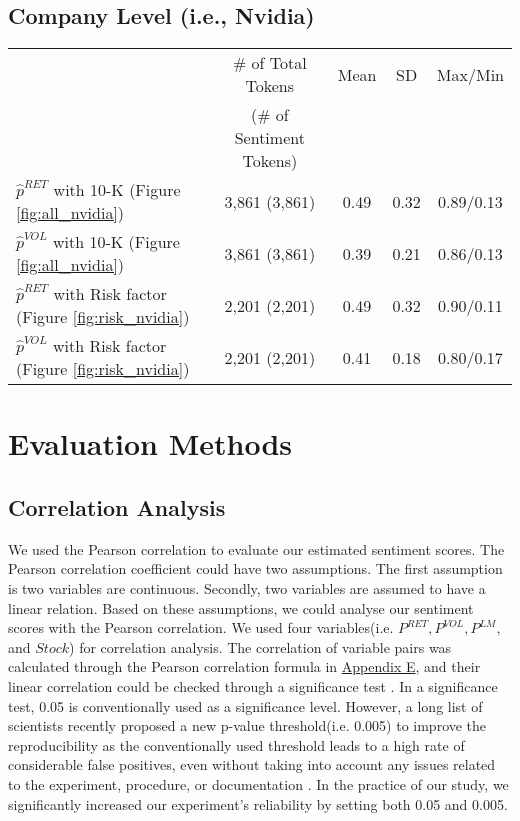 \documentclass[logo,bsc,singlespacing,parskip]{infthesis}
\begin{document}
\subsection*{Company Level (i.e., Nvidia)}
\begin{tabular}{lcccc}
\toprule
 & \# of Total Tokens & Mean & SD & Max/Min \\
 & (\# of Sentiment Tokens) &  &  &  \\
\midrule
$\hat{p}^{RET}$ with 10-K (Figure \ref{fig:all_nvidia})& 3,861 (3,861) & 0.49 & 0.32 & 0.89/0.13 \\
$\hat{p}^{VOL}$ with 10-K (Figure \ref{fig:all_nvidia})& 3,861 (3,861) & 0.39 & 0.21 & 0.86/0.13 \\
$\hat{p}^{RET}$ with Risk factor (Figure \ref{fig:risk_nvidia})& 2,201 (2,201) & 0.49 & 0.32 & 0.90/0.11 \\
$\hat{p}^{VOL}$ with Risk factor (Figure \ref{fig:risk_nvidia})& 2,201 (2,201) & 0.41 & 0.18 & 0.80/0.17 \\
\bottomrule
\end{tabular}


\section{Evaluation Methods}

\subsection{Correlation Analysis}
\label{correlation}
We used the Pearson correlation to evaluate our estimated sentiment scores. The Pearson correlation coefficient could have two assumptions\cite{PearsonCorrelationAssumptions2023}. The first assumption is two variables are continuous. Secondly, two variables are assumed to have a linear relation. Based on these assumptions, we could analyse our sentiment scores with the Pearson correlation. We used  four variables(i.e. $P^{RET}, P^{VOL}, P^{LM},$ and $ Stock $) for correlation analysis. The correlation of variable pairs was calculated through the Pearson correlation formula in \hyperref[pearson-formula]{Appendix E}, and their linear correlation could be checked through a significance test \cite{NCLHypothesisTesting}. In a significance test, 0.05 is conventionally used as a significance level. However, a long list of scientists recently proposed a new p-value threshold(i.e. 0.005) to improve the reproducibility as the conventionally used threshold leads to a high rate of considerable false positives, even without taking into account any issues related to the experiment, procedure, or documentation \cite{Benjamin2017Redefine}. In the practice of our study, we significantly increased our experiment's reliability by setting both 0.05 and 0.005. 
\end{document}
